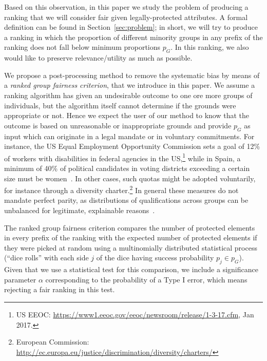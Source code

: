 Based on this observation, in this paper we study the problem of producing a ranking that we will consider fair given legally-protected attributes.
%
A formal definition can be found in Section~\ref{sec:problem}; in short, we will try to produce a ranking in which the proportion of different minority groups in any prefix of the ranking does not fall below minimum proportions $p_G$. In this ranking, we also would like to preserve relevance/utility as much as possible.
%

We propose a post-processing method to remove the systematic bias by means of a \emph{ranked group fairness criterion}, that we introduce in this paper.
%
We assume a ranking algorithm has given an undesirable outcome to one ore more groups of individuals, but the algorithm itself cannot determine if the grounds were appropriate or not.
%
Hence we expect the user of our method to know that the outcome is based on unreasonable or inappropriate grounds and provide $p_G$ as input which can originate in a legal mandate or in voluntary commitments.
%
For instance, the US Equal Employment Opportunity Commission sets a goal of 12\% of workers with disabilities in federal agencies in the US,\footnote{US EEOC: \url{https://www1.eeoc.gov/eeoc/newsroom/release/1-3-17.cfm}, Jan 2017.}
%
while in Spain, a minimum of 40\% of political candidates in voting districts exceeding a certain size must be women~\cite{verge2010gendering}.
%
In other cases, such quotas might be adopted voluntarily, for instance through a diversity charter.\footnote{European Commission: \url{http://ec.europa.eu/justice/discrimination/diversity/charters/}}
%
In general these measures do not mandate perfect parity, as distributions of qualifications across groups can be unbalanced for legitimate, explainable reasons~\cite{zliobaite2011handling,pedreschi2009integrating}. %


The ranked group fairness criterion compares the number of protected elements in every prefix of the ranking with the expected number of protected elements if they were picked at random using a multinomially distributed statistical process (``dice rolls'' with each side $ j $ of the dice having success probability $p_j \in p_G$).
%
Given that we use a statistical test for this comparison, we include a significance parameter $\alpha$ corresponding to the probability of a Type I error, which means rejecting a fair ranking in this test.

